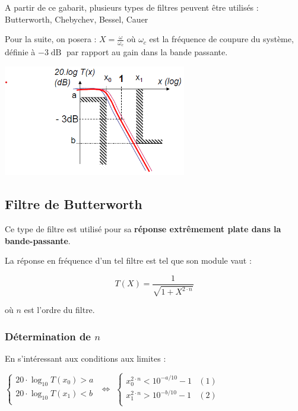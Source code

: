 \documentclass[a4paper,french]{paper}
\begin{document}
\medskip

A partir de ce gabarit, plusieurs types de filtres peuvent être utilisés : Butterworth, Chebychev, Bessel, Cauer

\bigskip

Pour la suite, on posera : $X = \frac{\omega}{\omega_c}$ où $\omega_c$ est la fréquence de coupure du système, définie à $-3\operatorname{dB}$ par rapport au gain dans la bande passante.


\begin{center}
	\includegraphics[width=8cm]{images/gabarit_butter.png}
\end{center}

\newpage
\subsection*{Filtre de Butterworth}

Ce type de filtre est utilisé pour sa \textbf{réponse extrêmement plate dans la bande-passante}.


La réponse en fréquence d'un tel filtre est tel que son module vaut :

$$ T(X) = \frac{1}{\sqrt{1 + X^{2\cdot n}}}$$

où $n$ est l'ordre du filtre.

\subsubsection*{Détermination de $n$}
En s'intéressant aux conditions aux limites :


$
\left\{
    \begin{array}{ll}
        20 \cdot \log_{10} T(x_0) > a \\
        20 \cdot \log_{10} T(x_1) < b \\
    \end{array}    
\right. 
$
$\Leftrightarrow$
$
\left\{
    \begin{array}{ll}
        x_0^{2\cdot n} < 10^{-a/10} - 1 & (1)\\
        x_1^{2\cdot n} > 10^{-b/10} - 1 & (2)\\
    \end{array}    
\right. 
$
\end{document}
